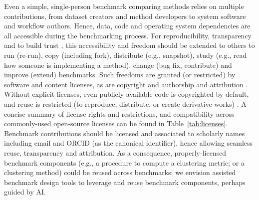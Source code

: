 \documentclass[11pt]{article}
\begin{document}
Even a simple, single-person benchmark comparing methods relies on multiple contributions, from dataset creators and method developers to system software and workflow authors. Hence, data, code and operating system dependencies are all accessible during the benchmarking process. For reproducibility, transparency and to build trust \cite{Laine2007-py}, this accessibility and freedom should be extended to others to run (re-run), copy (including fork), distribute (e.g., snapshot), study (e.g., read how someone is implementing a method), change (bug fix, contribute) and improve (extend) benchmarks. Such freedoms are granted (or restricted) by software and content licenses, as are copyright and authorship and attribution \cite{Kreutzer2014-ua}. Without explicit licenses, even publicly available code is copyrighted by default, and reuse is restricted (to reproduce, distribute, or create derivative works) \cite{Kreutzer2014-ua}. A concise summary of license rights and restrictions, and compatibility across commonly-used open-source licenses can be found in Table~\ref{tab:licenses}. Benchmark contributions should be licensed and associated to scholarly names including email and ORCID (as the canonical identifier), hence allowing seamless reuse, transparency and attribution. {\color{red} As a consequence, properly-licensed benchmark components (e.g., a procedure to compute a clustering metric; or a clustering method) could be reused across benchmarks; we envision assisted benchmark design tools to leverage and reuse benchmark components, perhaps guided by AI.}
\end{document}
